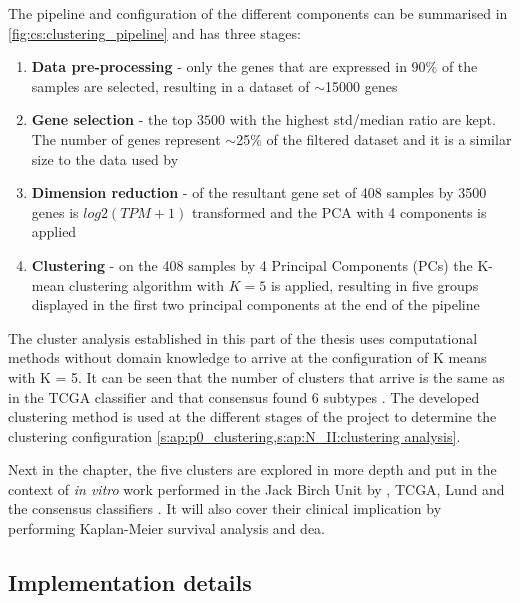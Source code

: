 The pipeline and configuration of the different components can be summarised in \cref{fig:cs:clustering_pipeline} and has three stages:
\begin{enumerate}
    \item \textbf{Data pre-processing} - only the genes that are expressed in 90\% of the samples are selected, resulting in a dataset of $\sim$15000 genes
    \item \textbf{Gene selection} - the top $3500$ with the highest std/median ratio are kept. The number of genes represent $\sim$25\% of the filtered dataset and it is a similar size to the data used by \citet{Robertson2017-mg}
    \item \textbf{Dimension reduction} - of the resultant gene set of 408 samples by 3500 genes is $log2(TPM+1)$ transformed and the PCA with 4 components is applied
    \item \textbf{Clustering} - on the 408 samples by 4 Principal Components (PCs) the K-mean clustering algorithm with $K=5$ is applied, resulting in five groups displayed in the first two principal components at the end of the pipeline
\end{enumerate}

The cluster analysis established in this part of the thesis uses computational methods without domain knowledge to arrive at the configuration of K means with K = 5. It can be seen that the number of clusters that arrive is the same as in the TCGA classifier \citep{Robertson2017-mg} and that consensus found 6 subtypes \citep{Kamoun2020-tj}. The developed clustering method is used at the different stages of the project to determine the clustering configuration \cref{s:ap:p0_clustering,s:ap:N_II:clustering analysis}.

Next in the chapter, the five clusters are explored in more depth and put in the context of \textit{in vitro} work performed in the Jack Birch Unit by \citet{Baker2022-bj}, TCGA, Lund and the consensus classifiers \citep{Robertson2017-mg, Marzouka2018-ge, Kamoun2020-tj}. It will also cover their clinical implication by performing Kaplan-Meier survival analysis and \acrlong{dea}.

\subsection*{Implementation details}

